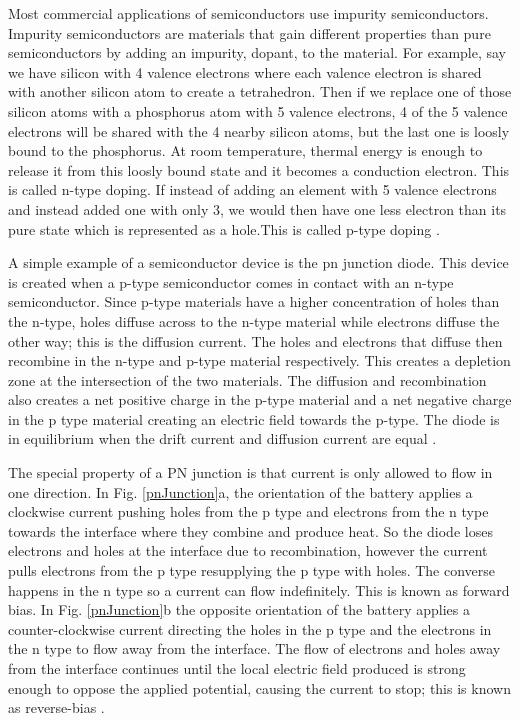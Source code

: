 \documentclass[ notitlepage, numerical, 11pt]{revtex4-1} %
\begin{document}
Most commercial applications of semiconductors use impurity semiconductors. Impurity semiconductors are materials that gain different properties than pure semiconductors by adding an impurity, dopant, to the material. For example, say we have silicon with 4 valence electrons where each valence electron is shared with another silicon atom to create a tetrahedron. Then if we replace one of those silicon atoms with a phosphorus atom with 5 valence electrons, 4 of the 5 valence electrons will be shared with the 4 nearby silicon atoms, but the last one is loosly bound to the phosphorus. At room temperature, thermal energy is enough to release it from this loosly bound state and it becomes a conduction electron. This is called n-type doping. If instead of adding an element with 5 valence electrons and instead added one with only 3, we would then have one less electron than its pure state which is represented as a hole.This is called p-type doping \cite{purcell}.

A simple example of a semiconductor device is the pn junction diode. This device is created when a p-type semiconductor comes in contact with an n-type semiconductor. Since p-type materials have a higher concentration of holes than the n-type, holes diffuse across to the n-type material while electrons diffuse the other way; this is the diffusion current. The holes and electrons that diffuse then recombine in the n-type and p-type material respectively. This creates a depletion zone at the intersection of the two materials. The diffusion and recombination also creates a net positive charge in the p-type material and a net negative charge in the p type material creating an electric field towards the p-type. The diode is in equilibrium when the drift current and diffusion current are equal \cite{thermo}.

The special property of a PN junction is that current is only allowed to flow in one direction. In Fig. \ref{pnJunction}a, the orientation of the battery applies a clockwise current pushing holes from the p type and electrons from the n type towards the interface where they combine and produce heat. So the diode loses electrons and holes at the interface due to recombination, however the current pulls electrons from the p type resupplying the p type with holes. The converse happens in the n type so a current can flow indefinitely. This is known as forward bias. In Fig. \ref{pnJunction}b the opposite orientation of the battery applies a counter-clockwise current directing the holes in the p type and the electrons in the n type to flow away from the interface. The flow of electrons and holes away from the interface continues until the local electric field produced is strong enough to oppose the applied potential, causing the current to stop; this is known as reverse-bias \cite{thermo}.
\end{document}
